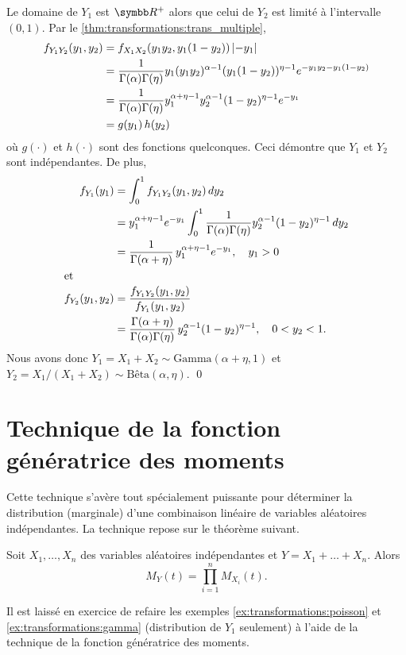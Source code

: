 \begin{exemple}
  Le domaine de $Y_1$ est $\R^+$ alors que celui de $Y_2$ est limité à
  l'intervalle $(0, 1)$. Par le \autoref{thm:transformations:trans_multiple},
  \begin{align*}
    f_{Y_1 Y_2}(y_1, y_2)
    &= f_{X_1 X_2}(y_1 y_2, y_1(1-y_2))\, \lvert -y_1 \rvert \\
    &= \frac{1}{\Gamma(\alpha) \Gamma(\eta)}
    y_1 (y_1 y_2)^{\alpha - 1} (y_1 (1 - y_2))^{\eta - 1} e^{-y_1 y_2
      - y_1(1 - y_2)} \\
    &=  \frac{1}{\Gamma(\alpha) \Gamma(\eta)}
    y_1^{\alpha + \eta - 1} y_2^{\alpha - 1} (1 - y_2)^{\eta - 1}
    e^{-y_1} \\
    &= g(y_1)\, h(y_2)
  \end{align*}
  où $g(\cdot)$ et $h(\cdot)$ sont des fonctions quelconques. Ceci
  démontre que $Y_1$ et $Y_2$ sont indépendantes. De plus,
  \begin{align*}
    f_{Y_1}(y_1)
    &= \int_0^1 f_{Y_1 Y_2}(y_1, y_2)\, dy_2 \\
    &= y_1^{\alpha + \eta - 1} e^{-y_1}
    \int_0^1 \frac{1}{\Gamma(\alpha) \Gamma(\eta)}
    y_2^{\alpha - 1} (1 - y_2)^{\eta - 1}\, dy_2 \\
    &= \frac{1}{\Gamma(\alpha + \eta)}\, y_1^{\alpha + \eta - 1}
    e^{-y_1}, \quad y_1 > 0 \\
    \intertext{et}
    f_{Y_2}(y_1, y_2)
    &= \frac{f_{Y_1 Y_2}(y_1, y_2)}{f_{Y_1}(y_1, y_2)} \\
    &= \frac{\Gamma(\alpha + \eta)}{\Gamma(\alpha) \Gamma(\eta)}\,
    y_2^{\alpha - 1} (1 - y_2)^{\eta - 1}, \quad
    0 < y_2 < 1.
  \end{align*}
  Nous avons donc $Y_1 = X_1 + X_2 \sim \text{Gamma}(\alpha + \eta, 1)$ et
  $Y_2 = X_1/(X_1 + X_2) \sim \text{Bêta}(\alpha, \eta)$. %
  \qed
\end{exemple}


\section{Technique de la fonction génératrice des moments}

Cette technique s'avère tout spécialement puissante pour déterminer la
distribution (marginale) d'une combinaison linéaire de variables
aléatoires indépendantes. La technique repose sur le théorème
suivant.

\begin{thm}
  Soit $X_1, \dots, X_n$ des variables aléatoires indépendantes et $Y
  = X_1 + \dots + X_n$. Alors
  \begin{displaymath}
    M_Y(t) = \prod_{i=1}^n M_{X_i}(t).
  \end{displaymath}
\end{thm}

Il est laissé en exercice de refaire les exemples
\ref{ex:transformations:poisson} et \ref{ex:transformations:gamma}
(distribution de $Y_1$ seulement) à l'aide de la technique de la
fonction génératrice des moments.

